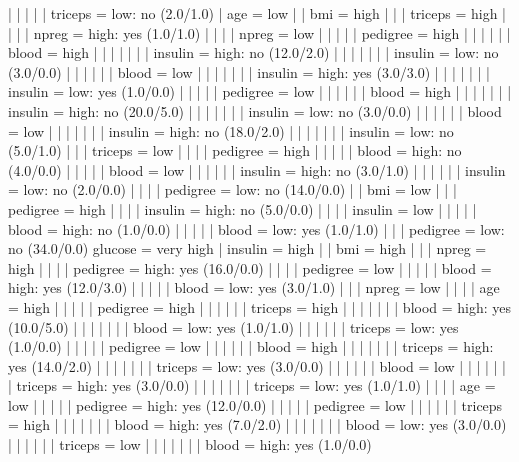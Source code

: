 |   |   |   |   |   triceps = low: no (2.0/1.0)
|   age = low
|   |   bmi = high
|   |   |   triceps = high
|   |   |   |   npreg = high: yes (1.0/1.0)
|   |   |   |   npreg = low
|   |   |   |   |   pedigree = high
|   |   |   |   |   |   blood = high
|   |   |   |   |   |   |   insulin = high: no (12.0/2.0)
|   |   |   |   |   |   |   insulin = low: no (3.0/0.0)
|   |   |   |   |   |   blood = low
|   |   |   |   |   |   |   insulin = high: yes (3.0/3.0)
|   |   |   |   |   |   |   insulin = low: yes (1.0/0.0)
|   |   |   |   |   pedigree = low
|   |   |   |   |   |   blood = high
|   |   |   |   |   |   |   insulin = high: no (20.0/5.0)
|   |   |   |   |   |   |   insulin = low: no (3.0/0.0)
|   |   |   |   |   |   blood = low
|   |   |   |   |   |   |   insulin = high: no (18.0/2.0)
|   |   |   |   |   |   |   insulin = low: no (5.0/1.0)
|   |   |   triceps = low
|   |   |   |   pedigree = high
|   |   |   |   |   blood = high: no (4.0/0.0)
|   |   |   |   |   blood = low
|   |   |   |   |   |   insulin = high: no (3.0/1.0)
|   |   |   |   |   |   insulin = low: no (2.0/0.0)
|   |   |   |   pedigree = low: no (14.0/0.0)
|   |   bmi = low
|   |   |   pedigree = high
|   |   |   |   insulin = high: no (5.0/0.0)
|   |   |   |   insulin = low
|   |   |   |   |   blood = high: no (1.0/0.0)
|   |   |   |   |   blood = low: yes (1.0/1.0)
|   |   |   pedigree = low: no (34.0/0.0)
glucose = very high
|   insulin = high
|   |   bmi = high
|   |   |   npreg = high
|   |   |   |   pedigree = high: yes (16.0/0.0)
|   |   |   |   pedigree = low
|   |   |   |   |   blood = high: yes (12.0/3.0)
|   |   |   |   |   blood = low: yes (3.0/1.0)
|   |   |   npreg = low
|   |   |   |   age = high
|   |   |   |   |   pedigree = high
|   |   |   |   |   |   triceps = high
|   |   |   |   |   |   |   blood = high: yes (10.0/5.0)
|   |   |   |   |   |   |   blood = low: yes (1.0/1.0)
|   |   |   |   |   |   triceps = low: yes (1.0/0.0)
|   |   |   |   |   pedigree = low
|   |   |   |   |   |   blood = high
|   |   |   |   |   |   |   triceps = high: yes (14.0/2.0)
|   |   |   |   |   |   |   triceps = low: yes (3.0/0.0)
|   |   |   |   |   |   blood = low
|   |   |   |   |   |   |   triceps = high: yes (3.0/0.0)
|   |   |   |   |   |   |   triceps = low: yes (1.0/1.0)
|   |   |   |   age = low
|   |   |   |   |   pedigree = high: yes (12.0/0.0)
|   |   |   |   |   pedigree = low
|   |   |   |   |   |   triceps = high
|   |   |   |   |   |   |   blood = high: yes (7.0/2.0)
|   |   |   |   |   |   |   blood = low: yes (3.0/0.0)
|   |   |   |   |   |   triceps = low
|   |   |   |   |   |   |   blood = high: yes (1.0/0.0)
